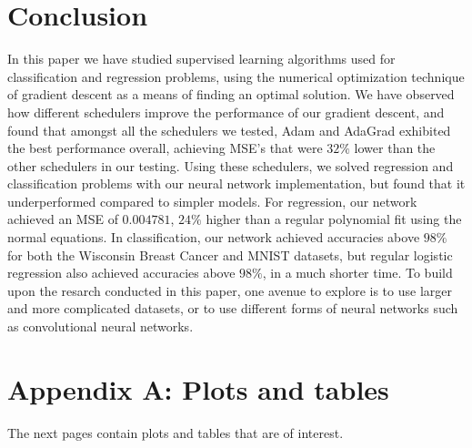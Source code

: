 \documentclass[onecolumn,10pt,cleanfoot]{asme2ej}
\begin{document}
\section{Conclusion}


In this paper we have studied supervised learning algorithms used for classification and regression problems, using the numerical optimization technique of gradient descent as a means of finding an optimal solution. We have observed how different schedulers improve the performance of our gradient descent, and found that amongst all the schedulers we tested, Adam and AdaGrad exhibited the best performance overall, achieving MSE's that were $32\%$ lower than the other schedulers in our testing. Using these schedulers, we solved regression and classification problems with our neural network implementation, but found that it underperformed compared to simpler models. For regression, our network achieved an MSE of $0.004781$, $24\%$ higher than a regular polynomial fit using the normal equations. In classification, our network achieved accuracies above $98\%$ for both the Wisconsin Breast Cancer and MNIST datasets, but regular logistic regression also achieved accuracies above $98\%$, in a much shorter time. To build upon the resarch conducted in this paper, one avenue to explore is to use larger and more complicated datasets, or to use different forms of neural networks such as convolutional neural networks.




\section*{Appendix A: Plots and tables}

The next pages contain plots and tables that are of interest.
\end{document}
